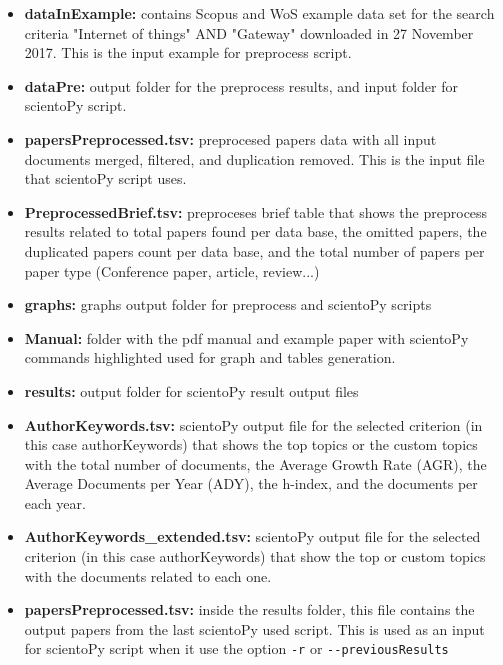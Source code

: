 \documentclass[10pt,letterpaper]{article}
\begin{document}
\begin{itemize}
	\item \textbf{dataInExample: } contains Scopus and WoS example data set for the search criteria "Internet of things" AND "Gateway" downloaded in 27 November 2017. This is the input example for preprocess script.
	
	\item \textbf{dataPre: } output folder for the preprocess results, and input folder for scientoPy script.
	
	\item \textbf{papersPreprocessed.tsv: } preprocesed papers data with all input documents merged, filtered, and duplication removed. This is the input file that scientoPy script uses.
	
	\item \textbf{PreprocessedBrief.tsv: } preproceses brief table that shows the preprocess results related to total papers found per data base, the omitted papers, the duplicated papers count per data base, and the total number of papers per paper type (Conference paper, article, review...)
	
	\item \textbf{graphs: } graphs output folder for preprocess and scientoPy scripts
	
	\item \textbf{Manual: } folder with the pdf manual and example paper with scientoPy commands highlighted used for graph and tables generation. 
	
	\item \textbf{results: } output folder for scientoPy result output files
	
	\item \textbf{AuthorKeywords.tsv: } scientoPy output file for the selected criterion (in this case authorKeywords) that shows the top topics or the custom  topics with the total number of documents, the Average Growth Rate (AGR), the Average Documents per Year (ADY), the h-index, and the documents per each year. 
	
	\item \textbf{AuthorKeywords\_extended.tsv: } scientoPy output file for the selected criterion (in this case authorKeywords) that show the top or custom topics with the documents related to each one.
	
	\item \textbf{papersPreprocessed.tsv: } inside the results folder, this file contains the output papers from the last scientoPy used script. This is used as an input for scientoPy script when it use the option \verb|-r| or \verb|--previousResults|
\end{itemize}
\end{document}

